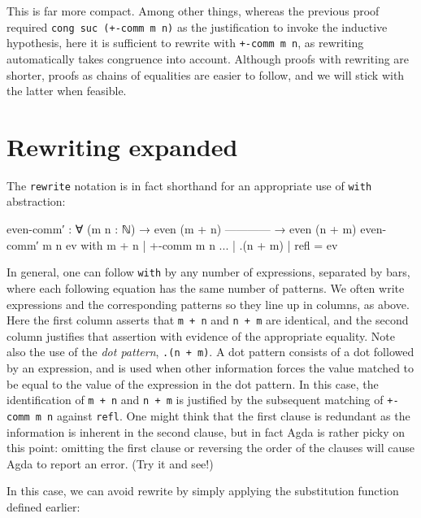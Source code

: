 This is far more compact. Among other things, whereas the previous proof
required \texttt{cong\ suc\ (+-comm\ m\ n)} as the justification to
invoke the inductive hypothesis, here it is sufficient to rewrite with
\texttt{+-comm\ m\ n}, as rewriting automatically takes congruence into
account. Although proofs with rewriting are shorter, proofs as chains of
equalities are easier to follow, and we will stick with the latter when
feasible.

\hypertarget{rewriting-expanded}{%
\section{Rewriting expanded}\label{rewriting-expanded}}

The \texttt{rewrite} notation is in fact shorthand for an appropriate
use of \texttt{with} abstraction:

\begin{fence}
\begin{code}
even-comm′ : ∀ (m n : ℕ)
  → even (m + n)
    ------------
  → even (n + m)
even-comm′ m n ev with   m + n  | +-comm m n
...                  | .(n + m) | refl       = ev
\end{code}
\end{fence}

In general, one can follow \texttt{with} by any number of expressions,
separated by bars, where each following equation has the same number of
patterns. We often write expressions and the corresponding patterns so
they line up in columns, as above. Here the first column asserts that
\texttt{m\ +\ n} and \texttt{n\ +\ m} are identical, and the second
column justifies that assertion with evidence of the appropriate
equality. Note also the use of the \emph{dot pattern},
\texttt{.(n\ +\ m)}. A dot pattern consists of a dot followed by an
expression, and is used when other information forces the value matched
to be equal to the value of the expression in the dot pattern. In this
case, the identification of \texttt{m\ +\ n} and \texttt{n\ +\ m} is
justified by the subsequent matching of \texttt{+-comm\ m\ n} against
\texttt{refl}. One might think that the first clause is redundant as the
information is inherent in the second clause, but in fact Agda is rather
picky on this point: omitting the first clause or reversing the order of
the clauses will cause Agda to report an error. (Try it and see!)

In this case, we can avoid rewrite by simply applying the substitution
function defined earlier:

